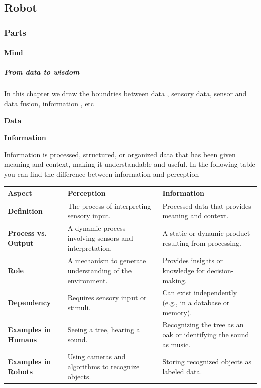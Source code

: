 \documentclass{book}
\providecommand{\ProjectDeepHeading}[2]{%
    \par\medskip\noindent\textbf{#2}\par\smallskip
}
\begin{document}
\subsection{Robot}

\subsubsection{Parts}

\paragraph{Mind}

\subparagraph{From data to wisdom}


In this chapter we draw the boundries between data , sensory data, sensor and data fusion, information , etc
        
        
        \ProjectDeepHeading{3}{Data}
        
        
        \ProjectDeepHeading{3}{Information} Information is processed, structured, or organized data that has been given meaning and context, making it understandable and useful. In the following table you can find the difference between information and perception
            \begin{tabular}{|l|l|l|}
                \hline
                \textbf{Aspect}             & \textbf{Perception}                                       & \textbf{Information}                                              \\ \hline
                \textbf{Definition}         & The process of interpreting sensory input.                & Processed data that provides meaning and context.                 \\ \hline
                \textbf{Process vs. Output} & A dynamic process involving sensors and interpretation. & A static or dynamic product resulting from processing. \\ \hline
                \textbf{Role}               & A mechanism to generate understanding of the environment. & Provides insights or knowledge for decision-making.               \\ \hline
                \textbf{Dependency}         & Requires sensory input or stimuli.                        & Can exist independently (e.g., in a database or memory).          \\ \hline
                \textbf{Examples in Humans} & Seeing a tree, hearing a sound.                           & Recognizing the tree as an oak or identifying the sound as music. \\ \hline
                \textbf{Examples in Robots} & Using cameras and algorithms to recognize objects.        & Storing recognized objects as labeled data.                       \\ \hline
            \end{tabular}
        
\end{document}
